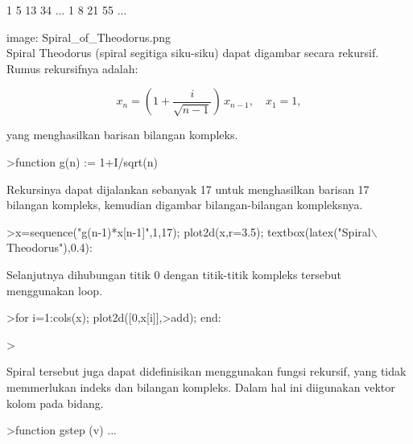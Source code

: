 \documentclass[a4paper,10pt]{article}
\begin{document}
\begin{eulernotebook}
\begin{eulercomment}
\begin{eulercomment}
\begin{eulercomment}
\begin{eulercomment}
\begin{eulercomment}
\begin{eulercomment}
\begin{eulercomment}
\begin{eulercomment}
\begin{eulercomment}
\begin{eulercomment}
\begin{eulercomment}
\begin{eulercomment}
\begin{eulercomment}
\begin{eulercomment}
\begin{eulercomment}
\begin{eulercomment}
\begin{eulercomment}
\begin{eulercomment}
\begin{eulercomment}
\begin{eulercomment}
\begin{euleroutput}
              1             5            13            34     ...
              1             8            21            55     ...
\end{euleroutput}
\begin{eulercomment}
image: Spiral\_of\_Theodorus.png\\
Spiral Theodorus (spiral segitiga siku-siku) dapat digambar secara rekursif. Rumus
rekursifnya adalah:

\end{eulercomment}
\begin{eulerformula}
\[
x_n = \left( 1 + \frac{i}{\sqrt{n-1}} \right) \, x_{n-1}, \quad x_1=1,
\]
\end{eulerformula}
\begin{eulercomment}
yang menghasilkan barisan bilangan kompleks.
\end{eulercomment}
\begin{eulerprompt}
>function g(n) := 1+I/sqrt(n)
\end{eulerprompt}
\begin{eulercomment}
Rekursinya dapat dijalankan sebanyak 17 untuk menghasilkan barisan 17 bilangan kompleks,
kemudian digambar bilangan-bilangan kompleksnya.
\end{eulercomment}
\begin{eulerprompt}
>x=sequence("g(n-1)*x[n-1]",1,17); plot2d(x,r=3.5); textbox(latex("Spiral\(\backslash\) Theodorus"),0.4):
\end{eulerprompt}
\begin{eulercomment}
Selanjutnya dihubungan titik 0 dengan titik-titik kompleks tersebut menggunakan loop.
\end{eulercomment}
\begin{eulerprompt}
>for i=1:cols(x); plot2d([0,x[i]],>add); end:
\end{eulerprompt}
\begin{eulerprompt}
> 
\end{eulerprompt}
\begin{eulercomment}
Spiral tersebut juga dapat didefinisikan menggunakan fungsi rekursif, yang tidak memmerlukan
indeks dan bilangan kompleks. Dalam hal ini diigunakan vektor kolom pada bidang.
\end{eulercomment}
\begin{eulerprompt}
>function gstep (v) ...

\end{eulerprompt}
\end{eulercomment}
\end{eulercomment}
\end{eulercomment}
\end{eulercomment}
\end{eulercomment}
\end{eulercomment}
\end{eulercomment}
\end{eulercomment}
\end{eulercomment}
\end{eulercomment}
\end{eulercomment}
\end{eulercomment}
\end{eulercomment}
\end{eulercomment}
\end{eulercomment}
\end{eulercomment}
\end{eulercomment}
\end{eulercomment}
\end{eulercomment}
\end{eulercomment}
\end{eulernotebook}
\end{document}
